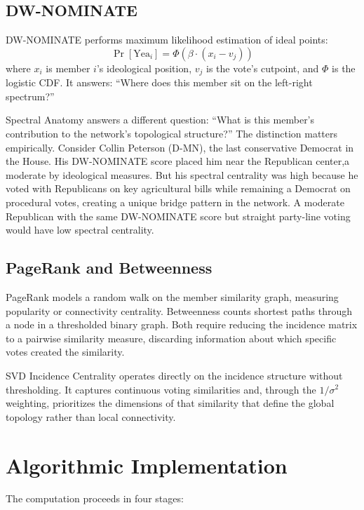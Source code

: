 \documentclass[11pt,a4paper]{article}
\begin{document}
\subsection{DW-NOMINATE}

DW-NOMINATE \citep{poole1985, poole2017} performs maximum likelihood estimation of ideal points:
\begin{equation}
\Pr[\text{Yea}_i] = \Phi(\beta \cdot (x_i - v_j))
\end{equation}
where $x_i$ is member $i$'s ideological position, $v_j$ is the vote's cutpoint, and $\Phi$ is the logistic CDF. It answers: ``Where does this member sit on the left-right spectrum?''

Spectral Anatomy answers a different question: ``What is this member's contribution to the network's topological structure?'' The distinction matters empirically. Consider Collin Peterson (D-MN), the last conservative Democrat in the House. His DW-NOMINATE score placed him near the Republican center,a moderate by ideological measures. But his spectral centrality was high because he voted with Republicans on key agricultural bills while remaining a Democrat on procedural votes, creating a unique bridge pattern in the network. A moderate Republican with the same DW-NOMINATE score but straight party-line voting would have low spectral centrality.

\subsection{PageRank and Betweenness}

PageRank models a random walk on the member similarity graph, measuring popularity or connectivity centrality. Betweenness counts shortest paths through a node in a thresholded binary graph. Both require reducing the incidence matrix to a pairwise similarity measure, discarding information about which specific votes created the similarity.

SVD Incidence Centrality operates directly on the incidence structure without thresholding. It captures continuous voting similarities and, through the $1/\sigma^2$ weighting, prioritizes the dimensions of that similarity that define the global topology rather than local connectivity.

\section{Algorithmic Implementation}

The computation proceeds in four stages:
\end{document}

